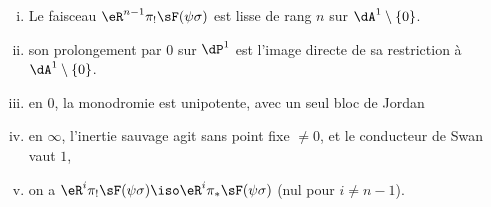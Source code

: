 \begin{theorem_}\label{VI:7-8}
\begin{enumerate}[(i)]
  \item Le faisceau $\eR^{n-1}\pi_! \sF(\psi\sigma)$ est lisse de rang $n$ sur 
    $\dA^1\setminus \{0\}$. 
  \item son prolongement par $0$ sur $\dP^1$ est l'image directe de sa 
    restriction à $\dA^1\setminus \{0\}$. 
  
\item {}en $0$, la monodromie est unipotente, avec un seul bloc de Jordan
  \item en $\infty$, l'inertie sauvage agit sans point fixe $\ne 0$, et le 
    conducteur de Swan vaut $1$, 
  \item on a $\eR^i \pi_! \sF(\psi\sigma) \iso \eR^i \pi_\ast \sF(\psi\sigma)$ 
    (nul pour $i\ne n-1$).
\end{enumerate}
\end{theorem_}
